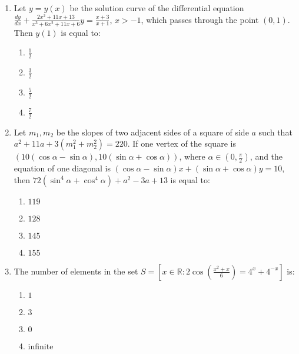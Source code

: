 \documentclass[journal]{IEEEtran}
\newcommand{\brak}[1]{\left( #1 \right)}
\newcommand{\sbrak}[1]{\left[ #1 \right]}
\newcommand{\gt}{>}
\begin{document}
\begin{enumerate}
    \item Let $y=y\brak{x}$ be the solution curve of the differential equation $\frac{dy}{dx}+\frac{2x^{2}+11x+13}{x^{3}+6x^{2}+11x+6}y=\frac{x+3}{x+1}$, $x\gt-1$, which passes through the point $\brak{0,1}$. Then $y\brak{1}$ is equal to:

        \begin{multicols}{4}
        \begin{enumerate}
        \item $\frac{1}{2}$
        \item $\frac{3}{2}$
        \item $\frac{5}{2}$
        \item $\frac{7}{2}$
        \end{enumerate}
        \end{multicols}

    \item Let $m_{1}, m_{2}$ be the slopes of two adjacent sides of a square of side $a$ such that $a^{2}+11a+3\brak{m_{1}^{2}+m_{2}^{2}}=220$. If one vertex of the square is $\brak{10\brak{\cos{\alpha}-\sin{\alpha}}, 10\brak{\sin{\alpha}+\cos{\alpha}}}$, where $\alpha\in\brak{0,\frac{\pi}{2}}$, and the equation of one diagonal is $\brak{\cos{\alpha}-\sin{\alpha}}x+\brak{\sin{\alpha}+\cos{\alpha}}y=10$, then $72\brak{\sin^{4}{\alpha}+\cos^{4}{\alpha}}+a^{2}-3a+13$ is equal to:

        \begin{multicols}{4}
        \begin{enumerate}
        \item $119$
        \item $128$
        \item $145$
        \item $155$
        \end{enumerate}
        \end{multicols}

    \item The number of elements in the set $S=\sbrak{x\in\mathbb{R}:2\cos\brak{\frac{x^{2}+x}{6}}=4^{x}+4^{-x}}$ is:

        \begin{multicols}{4}
        \begin{enumerate}
        \item $1$
        \item $3$
        \item $0$
        \item infinite
        \end{enumerate}
        \end{multicols}


\end{enumerate}
\end{document}
